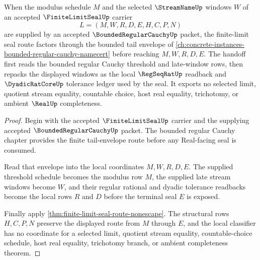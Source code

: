 \begin{theorem}
\label{thm:finite-limit-seal-bounded-regular-cauchy-route}
When the modulus schedule $M$ and the selected $\StreamNameUp$ windows $W$ of an accepted $\FiniteLimitSealUp$ carrier
$$
L=(M,W,R,D,E,H,C,P,N)
$$
are supplied by an accepted $\BoundedRegularCauchyUp$ packet, the finite-limit seal route factors through the bounded tail envelope of \autoref{ch:concrete-instances-bounded-regular-cauchy-namecert} before reaching $M,W,R,D,E$. The handoff first reads the bounded regular Cauchy threshold and late-window rows, then repacks the displayed windows as the local $\RegSeqRatUp$ readback and $\DyadicRatCoreUp$ tolerance ledger used by the seal. It exports no selected limit, quotient stream equality, countable choice, host real equality, trichotomy, or ambient $\RealUp$ completeness.
\end{theorem}
\begin{proof}
Begin with the accepted $\FiniteLimitSealUp$ carrier and the supplying accepted $\BoundedRegularCauchyUp$ packet. The bounded regular Cauchy chapter provides the finite tail-envelope route before any Real-facing seal is consumed.

Read that envelope into the local coordinates $M,W,R,D,E$. The supplied threshold schedule becomes the modulus row $M$, the supplied late stream windows become $W$, and their regular rational and dyadic tolerance readbacks become the local rows $R$ and $D$ before the terminal seal $E$ is exposed.

Finally apply \autoref{thm:finite-limit-seal-route-nonescape}. The structural rows $H,C,P,N$ preserve the displayed route from $M$ through $E$, and the local classifier has no coordinate for a selected limit, quotient stream equality, countable-choice schedule, host real equality, trichotomy branch, or ambient completeness theorem.
\end{proof}


\begin{closurestatus}{\FiniteLimitSealUp}
  \theoryclosure{\seedClosure}
  \formalstatus{\unformalizedV}
\end{closurestatus}
